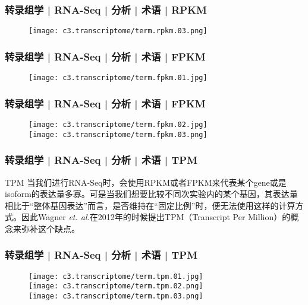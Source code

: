 \begin{frame}
  \frametitle{转录组学 | RNA-Seq | 分析 | 术语 | RPKM}
  \begin{figure}
    \centering
    \texttt{[image: c3.transcriptome/term.rpkm.03.png]}
  \end{figure}
\end{frame}

\begin{frame}
  \frametitle{转录组学 | RNA-Seq | 分析 | 术语 | FPKM}
  \begin{figure}
    \centering
    \texttt{[image: c3.transcriptome/term.fpkm.01.jpg]}
  \end{figure}
\end{frame}

\begin{frame}
  \frametitle{转录组学 | RNA-Seq | 分析 | 术语 | FPKM}
  \begin{figure}
    \centering
    \texttt{[image: c3.transcriptome/term.fpkm.02.jpg]}\\
    \vspace{1em}
    \texttt{[image: c3.transcriptome/term.fpkm.03.png]}
  \end{figure}
\end{frame}

\begin{frame}
  \frametitle{转录组学 | RNA-Seq | 分析 | 术语 | TPM}
  \begin{block}{TPM}
    当我们进行RNA-Seq时，会使用RPKM或者FPKM来代表某个gene或是isoform的表达量多寡。可是当我们想要比较不同次实验内的某个基因，其表达量相比于“整体基因表达”而言，是否维持在“固定比例”时，便无法使用这样的计算方式。因此Wagner \textit{et. al.}在2012年的时候提出TPM（Transcript Per Million）的概念来弥补这个缺点。
  \end{block}
\end{frame}

\begin{frame}
  \frametitle{转录组学 | RNA-Seq | 分析 | 术语 | TPM}
  \begin{figure}
    \centering
    \texttt{[image: c3.transcriptome/term.tpm.01.jpg]}\\
    \texttt{[image: c3.transcriptome/term.tpm.02.png]}\\
    \texttt{[image: c3.transcriptome/term.tpm.03.png]}
  \end{figure}
\end{frame}


